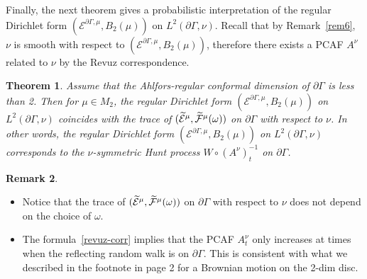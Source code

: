 \documentclass[10pt]{amsart}
\newtheorem{theo}{Theorem}[section]
\theoremstyle{definition}\newtheorem{defi}[theo]{Definition}\newtheorem{rema}[theo]{Remark}\newtheorem{exam}[theo]{Example}\newtheorem{exem}[theo]{Example}\newtheorem{nota}[theo]{Notation}
\newcommand{\ce}{\mathcal{E}}
\newcommand{\cf}{\mathcal{F}}
\let\oldtilde\tilde
\renewcommand*{\tilde}[1]{\mathchoice{\widetilde{#1}}{\widetilde{#1}}{\oldtilde{#1}}{\oldtilde{#1}}}
\begin{document}
Finally, the next theorem gives a probabilistic interpretation of the regular Dirichlet form $(\ce^{\partial\Gamma,\mu},B_2(\mu))$ on $L^2(\partial\Gamma,\nu)$. Recall that by Remark~\ref{rem6}, $\nu$ is smooth with respect to $(\ce^{\partial\Gamma,\mu},B_2(\mu))$, therefore there exists a PCAF $A^{\nu}$ related to $\nu$ by the Revuz correspondence.


\begin{theo}\label{trace}
Assume that the Ahlfors-regular conformal dimension of $\partial\Gamma$ is less than 2. Then for $\mu\in M_2$, the regular Dirichlet form $(\ce^{\partial\Gamma,\mu},B_2(\mu))$ on $L^2(\partial\Gamma,\nu)$ coincides with the trace of $(\tilde\ce^{\mu}, \tilde\cf^{\mu}(\omega))$ on $\partial\Gamma$ with respect to $\nu$. In other words, the regular Dirichlet form $(\ce^{\partial\Gamma,\mu},B_2(\mu))$ on $L^2(\partial\Gamma,\nu)$ corresponds to the $\nu$-symmetric Hunt process $W\circ (A^{\nu})_t^{-1}$ on $\partial\Gamma$.
\end{theo}


\begin{rema}\leavevmode
\begin{itemize}
\item Notice that the trace of $(\tilde\ce^{\mu}, \tilde\cf^{\mu}(\omega))$ on $\partial\Gamma$ with respect to $\nu$ does not depend on the choice of $\omega$.
\item The formula~\eqref{revuz-corr} implies that the PCAF $A^{\nu}_t$ only increases at times when the reflecting random walk is on $\partial\Gamma$. This is consistent with what we described in the footnote in page 2 for a Brownian motion on the 2-dim disc.
\end{itemize}
\end{rema}
\end{document}
